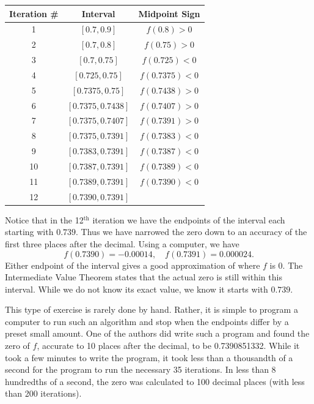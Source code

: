 \begin{solution}
{%
			{ \noindent \begin{tabular}{ccc}
			Iteration \# & Interval & Midpoint Sign \\ \hline
			1		& $[0.7,0.9]$ & $f(0.8) >0$ \\
			2 & $[0.7,0.8] $ & $f(0.75) >0$ \\
			3 & $[0.7,0.75]$ & $f(0.725)<0$\\
			4 & $[0.725,0.75]$ & $f(0.7375)<0$\\
			5 & $[0.7375,0.75]$ & $f(0.7438)>0$\\
			6 & $[0.7375,0.7438]$ & $f(0.7407)>0$\\
			7 & $[0.7375,0.7407]$ & $f(0.7391)>0$\\
			8 & $[0.7375,0.7391]$ & $f(0.7383)<0$\\
			9 & $[0.7383,0.7391]$ & $f(0.7387)<0$\\
			10 & $[0.7387,0.7391]$ & $f(0.7389)<0$\\
			11 & $[0.7389,0.7391]$ & $f(0.7390)<0$\\
			12 & $[0.7390,0.7391]$ &   \\
			\end{tabular}
			}%
			
Notice that in the 12$^\text{th}$ iteration we have the endpoints of the interval each starting with $0.739$. Thus we have narrowed the zero down to an accuracy of the first three places after the decimal. Using a computer, we have 
$$ f(0.7390) = -0.00014, \quad f(0.7391) = 0.000024.$$ Either endpoint of the interval gives a good approximation of where $f$ is 0. The Intermediate Value Theorem states that the actual zero is still within this interval. While we do not know its exact value, we know it starts with $0.739$. 

This type of exercise is rarely done by hand. Rather, it is simple to program a computer to run such an algorithm and stop when the endpoints differ by a preset small amount. One of the authors did write such a program and found the zero of $f$, accurate to 10 places after the decimal, to be 0.7390851332. While it took a few minutes to write the program, it took less than a thousandth of a second for the program to run the necessary 35 iterations. In less than 8 hundredths of a second, the zero was calculated to 100 decimal places (with less than 200 iterations).
}\\
\end{solution}




